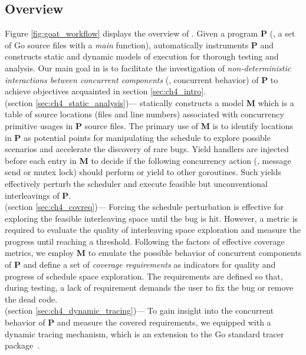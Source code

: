 \subsection{Overview}
\label{sec:ch4_overview}
Figure \ref{fig:goat_workflow} displays the overview of \goat.
%
Given a program \textbf{P} (\ie, a set of Go source files with a \textit{main} function), \goat automatically instruments \textbf{P} and constructs static and dynamic models of execution for thorough testing and analysis.
%
Our main goal in \goat is to facilitate the investigation of \textit{non-deterministic interactions between concurrent components} (\ie, concurrent behavior) of \textbf{P} to achieve objectives acquainted in section \ref{sec:ch4_intro}.
%
\\
 (section \ref{sec:ch4_static_analysis})---
\goat statically constructs a model \textbf{M} which is a table of source locations (files and line numbers) associated with concurrency primitive usages in \textbf{P} source files.
%
The primary use of \textbf{M} is to identify locations in \textbf{P} as potential points for manipulating the schedule to explore possible scenarios and accelerate the discovery of rare bugs.
%
Yield handlers are injected before each entry in \textbf{M} to decide if the following concurrency action (\eg, message send or mutex lock) should perform or yield to other goroutines.
%
Such yields effectively perturb the scheduler and execute feasible but unconventional interleavings of \textbf{P}.
%
\\
 (section \ref{sec:ch4_covreq})---
Forcing the schedule perturbation is effective for exploring the feasible interleaving space until the bug is hit.
%
However, a metric is required to evaluate the quality of interleaving space exploration and measure the progress until reaching a threshold.
%
Following the factors of effective coverage metrics, we employ \textbf{M} to emulate the possible behavior of concurrent components of \textbf{P} and define a set of \textit{coverage requirements} as indicators for quality and progress of schedule space exploration.
%
The requirements are defined so that, during testing, a lack of requirement demands the user to fix the bug or remove the dead code.
\\
 (section \ref{sec:ch4_dynamic_tracing})---
To gain insight into the concurrent behavior of \textbf{P} and measure the covered requirements, we equipped \goat with a dynamic tracing mechanism, which is an extension to the Go standard tracer package~\cite{go-cmd-trace}.
